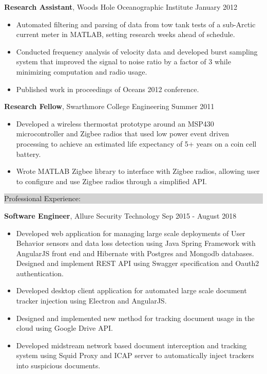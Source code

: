 \documentclass{article} %
\newcommand{\rsection}[1]{
  \hspace{-0.4cm}\vspace{0.1cm}
\colorbox{lightgrey}{
\begin{minipage}{1.07\linewidth}
\vspace{0.22cm}
\fontsize{14pt}{16pt}\selectfont #1 
\vspace{0.12cm}
\end{minipage}
}
\vspace*{-0.1cm}
}
\newcommand{\rjob}[2]{
  \hspace*{-0.3cm}
{\fontsize{10pt}{12pt}\selectfont #1} \hfill #2 
\vspace*{0.1cm} 
\hspace*{-1.2cm}
}
\newenvironment{ritemize}{
\hspace*{-0.8cm} 
\begin{minipage}{1.05\linewidth}
\begin{itemize}
}{
\end{itemize}
\end{minipage}
}
\newcommand{\ritem}{
\item[-]
}
\begin{document}
\pagebreak{}

\rjob{\textbf{Research Assistant}, Woods Hole Oceanographic Institute}{January 2012}\\
\begin{ritemize}
\ritem Automated filtering and parsing of data from tow tank tests of a sub-Arctic current meter in MATLAB, setting research weeks ahead of schedule.
\ritem Conducted frequency analysis of velocity data and developed burst sampling system that improved the signal to noise ratio by a factor of 3 while minimizing computation and radio usage. 
\ritem Published work in proceedings of Oceans 2012 conference.
\end{ritemize}

\rjob{\textbf{Research Fellow}, Swarthmore College Engineering}{Summer 2011}\\
\begin{ritemize}
\ritem Developed a wireless thermostat prototype around an MSP430 microcontroller and Zigbee radios that used low power event driven processing to achieve an estimated life expectancy of 5+ years on a coin cell battery.
\ritem Wrote MATLAB Zigbee library to interface with Zigbee radios, allowing user to configure and use Zigbee radios through a simplified API.
\end{ritemize}

\rsection{Professional Experience:}

\rjob{\textbf{Software Engineer}, Allure Security Technology}{Sep 2015 - August 2018}\\
\begin{ritemize}
\ritem Developed web application for managing large scale deployments of User Behavior sensors and data loss detection using Java Spring Framework with AngularJS front end and Hibernate with Postgres and Mongodb databases. Designed and implement REST API using Swagger specification and Oauth2 authentication. 
\ritem Developed desktop client application for automated large scale document tracker injection using Electron and AngularJS.
\ritem Designed and implemented new method for tracking document usage in the cloud using Google Drive API.
\ritem Developed midstream network based document interception and tracking system using Squid Proxy and ICAP server to automatically inject trackers into suspicious documents.
\end{ritemize}
\end{document}
